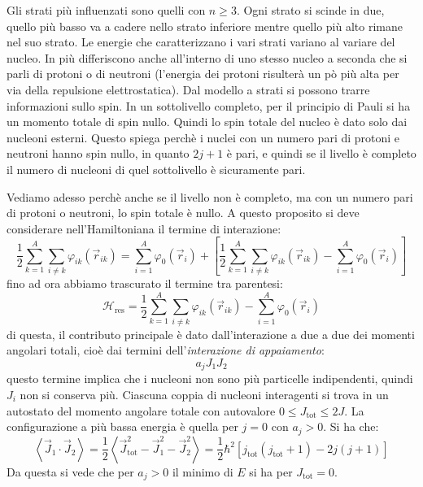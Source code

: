 Gli strati più influenzati sono quelli con $n \ge 3$. Ogni strato si scinde in
due, quello più basso va a cadere nello strato inferiore mentre quello più 
alto
rimane nel suo strato. Le energie che caratterizzano i vari strati variano al
variare del nucleo. In più differiscono anche all'interno di uno stesso nucleo 
a
seconda che si parli di protoni o di neutroni (l'energia dei protoni risulterà
un pò più alta per via della repulsione elettrostatica).
Dal modello a strati si possono trarre informazioni sullo spin.
In un sottolivello completo, per il principio di Pauli si ha un momento totale
di spin nullo. Quindi lo spin totale del nucleo è dato solo dai nucleoni
esterni. Questo spiega perchè i nuclei con un numero pari di protoni e neutroni
hanno spin nullo, in quanto $2j+1$ è pari, e quindi se il livello è completo 
il
numero di nucleoni di quel sottolivello è sicuramente pari.

Vediamo adesso perchè anche se il livello non è completo, ma con un numero 
pari
di protoni o neutroni, lo spin totale è nullo.
A questo proposito si deve considerare nell'Hamiltoniana il termine di 
interazione:
\begin{equation}
\frac{1}{2} \sum_{k=1}^A \sum_{i \ne k} \varphi_{ik}{\left( 
\vec{r}_{ik}\right)} = \sum_{i=1}^A \varphi_0{(\vec{r}_i)} + \left[ \frac{1}{2} 
\sum_{k=1}^A \sum_{i \ne k} \varphi_{ik}{\left( \vec{r}_{ik}\right)} - 
\sum_{i=1}^A \varphi_0{(\vec{r}_i)} \right] 
\end{equation}
fino ad ora abbiamo trascurato il termine tra parentesi:
\begin{equation}
\mathcal{H}_\text{res} = \frac{1}{2} \sum_{k=1}^A \sum_{i \ne k} 
\varphi_{ik}{\left( \vec{r}_{ik}\right)} - \sum_{i=1}^A \varphi_0{(\vec{r}_i)}
\end{equation}
di questa, il contributo principale è dato dall'interazione a due a due dei
momenti angolari totali, cioè dai termini dell'\textit{interazione di
appaiamento}:
\begin{equation}
a_j J_1 J_2
\end{equation}
questo termine implica che i nucleoni non sono più particelle indipendenti,
quindi $J_i$ non si conserva più. Ciascuna coppia di nucleoni interagenti si
trova in un autostato del momento angolare totale con autovalore $0 \le
J_\text{tot} \le 2J$. La configurazione a più bassa energia è quella per $j = 
0$
con $a_j > 0$. Si ha che:
\begin{equation}
\left\langle \vec{J}_1 \cdot \vec{J}_2 \right\rangle = \frac{1}{2} \left\langle 
\vec{J}_\text{tot}^2 - \vec{J}_{1}^2 - \vec{J}_{2}^2 \right\rangle = 
\frac{1}{2} \hbar^2 \left[ j_\text{tot}(j_\text{tot} + 1) - 2j(j + 1) \right] 
\end{equation}
Da questa si vede che per $a_j > 0$ il minimo di $E$ si ha per $J_\text{tot} = 
0$.

